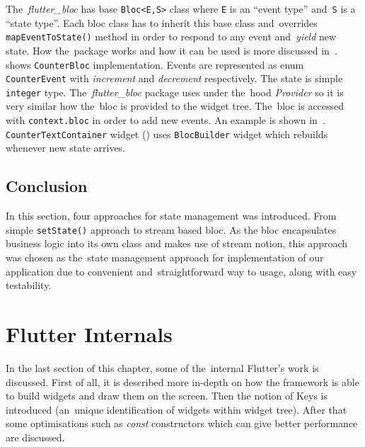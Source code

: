 The~\textit{flutter\_bloc} has base \verb|Bloc<E,S>| class where \verb|E| is an ``event type'' and~\verb|S| is a ``state type''. Each \gls{bloc} class has to inherit this base class and~overrides \verb|mapEventToState()| method in order to respond to any event and~\textit{yield} new state. How the~package works and how it can be used is more discussed in~.  shows \verb|CounterBloc| implementation. Events are represented as enum \verb|CounterEvent| with \textit{increment} and \textit{decrement} respectively. The state is simple \verb|integer| type. The~\textit{flutter\_bloc} package uses under the~hood \textit{Provider} so it is very similar how the~\gls{bloc} is provided to the widget tree. The~\gls{bloc} is accessed with \verb|context.bloc| in order to add new events. An example is shown in~.  \verb|CounterTextContainer| widget () uses \verb|BlocBuilder| widget which rebuilds whenever new state arrives. 
\subsection{Conclusion}
In this section, four approaches for state management was introduced. From simple \verb|setState()| approach to stream based \gls{bloc}. As the \gls{bloc} encapsulates business logic into its own class and makes use of stream notion, this approach was chosen as the~state management approach for implementation of our application due to convenient and~straightforward way to usage, along with easy testability.
\section{Flutter Internals}
In the last section of this chapter, some of the~internal Flutter's work is discussed. First of all, it is described more in-depth on how the framework is able to build widgets and draw them on the screen. Then the notion of Keys is introduced (an~unique identification of widgets within widget tree). After that some optimisations such as \textit{const} constructors which can give better performance are discussed. 

